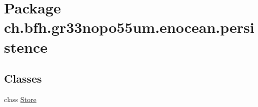\hypertarget{namespacech_1_1bfh_1_1gr33nopo55um_1_1enocean_1_1persistence}{}\section{Package ch.\+bfh.\+gr33nopo55um.\+enocean.\+persistence}
\label{namespacech_1_1bfh_1_1gr33nopo55um_1_1enocean_1_1persistence}
\subsection*{Classes}
\begin{DoxyCompactItemize}
\item 
class \hyperlink{classch_1_1bfh_1_1gr33nopo55um_1_1enocean_1_1persistence_1_1_store}{Store}
\end{DoxyCompactItemize}
